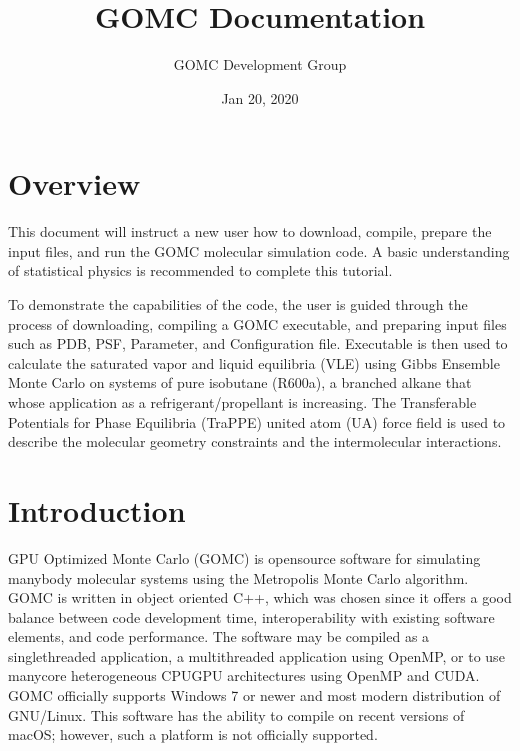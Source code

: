 \documentclass[letterpaper,10pt,english]{sphinxmanual}
\title{GOMC Documentation}
\date{Jan 20, 2020}
\author{GOMC Development Group}
\begin{document}
\pagestyle{empty}
\sphinxmaketitle
\pagestyle{plain}
\sphinxtableofcontents
\pagestyle{normal}
\label{\detokenize{index::doc}}



\chapter{Overview}
\label{\detokenize{overview:overview}}\label{\detokenize{overview::doc}}
This document will instruct a new user how to download, compile, prepare the input files, and run the GOMC molecular simulation code. A basic understanding of statistical physics is recommended to complete this tutorial.

To demonstrate the capabilities of the code, the user is guided through the process of downloading, compiling a GOMC executable, and preparing input files such as PDB, PSF, Parameter, and Configuration file. Executable is then used to calculate the saturated vapor and liquid equilibria (VLE) using Gibbs Ensemble Monte Carlo on systems of pure isobutane (R600a), a branched alkane that whose application as a refrigerant/propellant is increasing. The Transferable Potentials for Phase Equilibria (TraPPE) united atom (UA) force field is used to describe the molecular geometry constraints and the intermolecular interactions.



\chapter{Introduction}
\label{\detokenize{introduction:introduction}}\label{\detokenize{introduction::doc}}
GPU Optimized Monte Carlo (GOMC) is open\sphinxhyphen{}source software for simulating many\sphinxhyphen{}body molecular systems using the Metropolis Monte Carlo algorithm. GOMC is written in object oriented C++, which was chosen since it offers a good balance between code development time, interoperability with existing software elements, and code performance. The software may be compiled as a single\sphinxhyphen{}threaded application, a multi\sphinxhyphen{}threaded application using OpenMP, or to use many\sphinxhyphen{}core heterogeneous CPU\sphinxhyphen{}GPU architectures using OpenMP and CUDA. GOMC officially supports Windows 7 or newer and most modern distribution of GNU/Linux. This software has the ability to compile on recent versions of macOS; however, such a platform is not officially supported.
\end{document}
